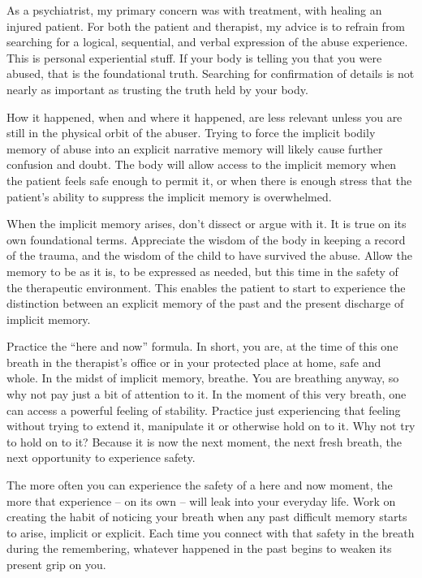 \documentclass[]{book}
\begin{document}
As a psychiatrist, my primary concern was with treatment, with healing an injured patient. For both the patient and therapist, my advice is to refrain from searching for a logical, sequential, and verbal expression of the abuse experience. This is personal experiential stuff. If your body is telling you that you were abused, that is the foundational truth. Searching for confirmation of details is not nearly as important as trusting the truth held by your body.

How it happened, when and where it happened, are less relevant unless you are still in the physical orbit of the abuser. Trying to force the implicit bodily memory of abuse into an explicit narrative memory will likely cause further confusion and doubt. The body will allow access to the implicit memory when the patient feels safe enough to permit it, or when there is enough stress that the patient's ability to suppress the implicit memory is overwhelmed.

When the implicit memory arises, don't dissect or argue with it. It is true on its own foundational terms. Appreciate the wisdom of the body in keeping a record of the trauma, and the wisdom of the child to have survived the abuse. Allow the memory to be as it is, to be expressed as needed, but this time in the safety of the therapeutic environment. This enables the patient to start to experience the distinction between an explicit memory of the past and the present discharge of implicit memory.

Practice the ``here and now'' formula. In short, you are, at the time of this one breath in the therapist's office or in your protected place at home, safe and whole. In the midst of implicit memory, breathe. You are breathing anyway, so why not pay just a bit of attention to it. In the moment of this very breath, one can access a powerful feeling of stability. Practice just experiencing that feeling without trying to extend it, manipulate it or otherwise hold on to it. Why not try to hold on to it? Because it is now the next moment, the next fresh breath, the next opportunity to experience safety.

The more often you can experience the safety of a here and now moment, the more that experience -- on its own -- will leak into your everyday life. Work on creating the habit of noticing your breath when any past difficult memory starts to arise, implicit or explicit. Each time you connect with that safety in the breath during the remembering, whatever happened in the past begins to weaken its present grip on you.
\end{document}
